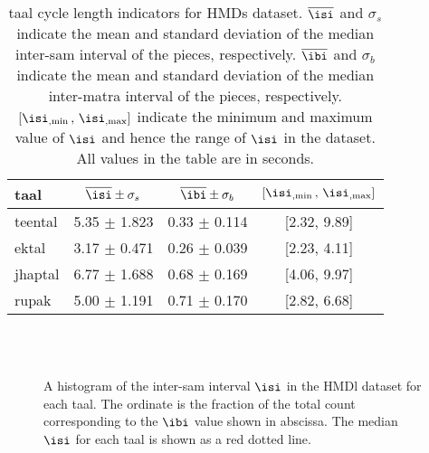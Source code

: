 \begin{table}[t]
\begin{center}
\begin{tabular}{@{}lccc@{}}
\toprule 
\Gls{taal} & $\overline{\isi} \pm \sigma_s$ & $\overline{\ibi} \pm \sigma_b$  & $[{\isi}_{,\min} \, , \,  {\isi}_{,\max} ]$ \tabularnewline
\midrule 
\Gls{teental} & 5.35 $\pm$ 1.823 & 0.33 $\pm$ 0.114 & {[}2.32, 9.89{]}\tabularnewline
\Gls{ektal} & 3.17 $\pm$ 0.471 & 0.26 $\pm$ 0.039 & {[}2.23, 4.11{]}\tabularnewline
\Gls{jhaptal} & 6.77 $\pm$ 1.688 & 0.68 $\pm$ 0.169 & {[}4.06, 9.97{]}\tabularnewline
\Gls{rupak} & 5.00 $\pm$ 1.191 & 0.71 $\pm$ 0.170 & {[}2.82, 6.68{]}\tabularnewline
\bottomrule 
\end{tabular}
\end{center}
\protect\caption[\Gls{taal} cycle length indicators for \acrshort{HMDs} dataset]{\Gls{taal} cycle length indicators for \acrshort{HMDs} dataset. $\overline{\isi}$ and $\sigma_s$ indicate the mean and standard deviation of the median inter-\gls{sam} interval of the pieces, respectively. $\overline{\ibi}$ and $\sigma_b$ indicate the mean and standard deviation of the median inter-\gls{matra} interval of the pieces, respectively. $[{\isi}_{,\min} \, , \,  {\isi}_{,\max}]$ indicate the minimum and maximum value of $\isi$ and hence the range of $\isi$ in the dataset. All values in the table are in seconds.}
\label{tab:datastat:hmds}
\end{table}
\begin{figure}[t]
\centering
{} \hspace{0.5cm} 
 \\ 
 \hspace{0.5cm} 
 \\ 
\caption[Histogram of $\protect\isi$ in the \acrshort{HMDl} dataset]{A histogram of the inter-\gls{sam} interval $\protect\isi$ in the \acrshort{HMDl} dataset for each \gls{taal}. The ordinate is the fraction of the total count corresponding to the $\ibi$ value shown in abscissa. The median $\isi$ for each \gls{taal} is shown as a red dotted line.}\label{fig:dstats:HMDl:ISI}
\end{figure}
